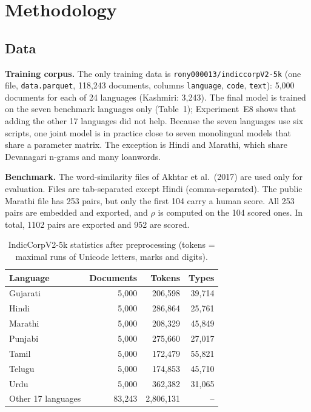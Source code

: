 \documentclass[11pt,a4paper]{article}
\begin{document}
\section{Methodology}
\subsection{Data}
\textbf{Training corpus.} The only training data is \texttt{rony000013/indiccorpV2-5k} (one file, \texttt{data.parquet}, 118{,}243 documents, columns \texttt{language}, \texttt{code}, \texttt{text}): 5{,}000 documents for each of 24 languages (Kashmiri: 3{,}243). The final model is trained on the seven benchmark languages only (Table~1); Experiment~E8 shows that adding the other 17 languages did not help. Because the seven languages use six scripts, one joint model is in practice close to seven monolingual models that share a parameter matrix. The exception is Hindi and Marathi, which share Devanagari n-grams and many loanwords.

\textbf{Benchmark.} The word-similarity files of Akhtar et al.\ (2017) are used only for evaluation. Files are tab-separated except Hindi (comma-separated). The public Marathi file has 253 pairs, but only the first 104 carry a human score. All 253 pairs are embedded and exported, and $\rho$ is computed on the 104 scored ones. In total, 1102 pairs are exported and 952 are scored.
\begin{table}[H]\centering\small
\caption{IndicCorpV2-5k statistics after preprocessing (tokens = maximal runs of Unicode letters, marks and digits).}
\begin{tabular}{lrrr}\toprule
Language & Documents & Tokens & Types \\\midrule
Gujarati & 5,000 & 206,598 & 39,714 \\
Hindi & 5,000 & 286,864 & 25,761 \\
Marathi & 5,000 & 208,329 & 45,849 \\
Punjabi & 5,000 & 275,660 & 27,017 \\
Tamil & 5,000 & 172,479 & 55,821 \\
Telugu & 5,000 & 174,853 & 45,710 \\
Urdu & 5,000 & 362,382 & 31,065 \\
\midrule
Other 17 languages & 83,243 & 2,806,131 & -- \\
\bottomrule\end{tabular}\end{table}
\end{document}
